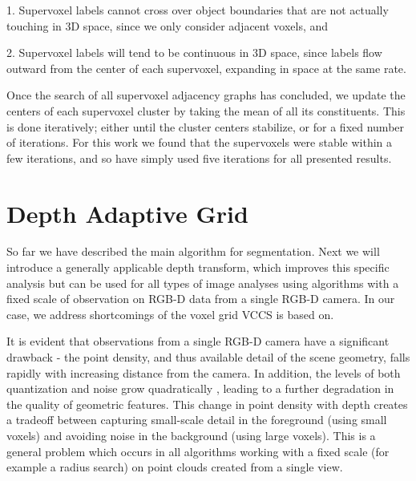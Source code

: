 1. Supervoxel labels cannot cross over object boundaries that are not actually touching in 3D space, since we only consider adjacent voxels, and 

2. Supervoxel labels will tend to be continuous in 3D space, since labels flow outward from the center of each supervoxel, expanding in space at the same rate.

Once the search of all supervoxel adjacency graphs has concluded, we update the centers of each supervoxel cluster by taking the mean of all its constituents. This is done iteratively; either until the cluster centers stabilize, or for a fixed number of iterations. For this work we found that the supervoxels were stable within a few iterations, and so have simply used five iterations for all presented results. 

\section{Depth Adaptive Grid}
So far we have described the main algorithm for segmentation. Next we will introduce a generally applicable depth transform, which improves this specific analysis but can be used for all types of image analyses using algorithms with a fixed scale of observation on RGB-D data from a single RGB-D camera. In our case, we address shortcomings of the voxel grid VCCS is based on.

It is evident that observations from a single RGB-D camera have a significant drawback - the point density, and thus available detail of the scene geometry, falls rapidly with increasing distance from the camera. In addition, the levels of both quantization and noise grow quadratically \cite{ICCV11smisek, Khoshelham2012}, leading to a further degradation in the quality of geometric features. This change in point density with depth creates a tradeoff between capturing small-scale detail in the foreground (using small voxels) and avoiding noise in the background (using large voxels). This is a general problem which occurs in all algorithms working with a fixed scale (for example a radius search) on point clouds created from a single view.

